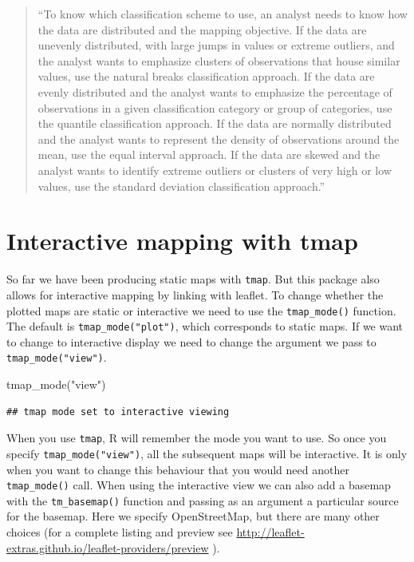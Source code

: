 \documentclass[
]{book}
\makeatletter
\newenvironment{Shaded}{\begin{snugshade}}{\end{snugshade}}
\newcommand{\FunctionTok}[1]{\textcolor[rgb]{0,0,0}{#1}}
\newcommand{\NormalTok}[1]{#1}
\newcommand{\StringTok}[1]{\textcolor[rgb]{0.5,0.5,0.5}{#1}}
\newenvironment{kframe}{%
\medskip{}
\setlength{\fboxsep}{.8em}
 \def\at@end@of@kframe{}%
 \ifinner\ifhmode%
  \def\at@end@of@kframe{\end{minipage}}%
  \begin{minipage}{\columnwidth}%
 \fi\fi%
 \def\FrameCommand##1{\hskip\@totalleftmargin \hskip-\fboxsep
 \colorbox{shadecolor}{##1}\hskip-\fboxsep
     \hskip-\linewidth \hskip-\@totalleftmargin \hskip\columnwidth}%
 \MakeFramed {\advance\hsize-\width
   \@totalleftmargin\z@ \linewidth\hsize
   \@setminipage}}%
 {\par\unskip\endMakeFramed%
 \at@end@of@kframe}
\renewenvironment{Shaded}{\begin{kframe}}{\end{kframe}}
\makeatother
\begin{document}
\begin{quote}
``To know which classification scheme to use, an analyst needs to know how the
data are distributed and the mapping objective. If the data are unevenly distributed, with large jumps in values or extreme outliers, and the analyst wants to emphasize clusters of observations that house similar values, use the natural breaks classification approach. If the data are evenly distributed and the analyst wants to emphasize the percentage of observations in a given classification category or group of categories, use the quantile classification approach. If the data are normally distributed and the analyst wants to represent the density of observations around the mean, use the equal interval approach. If the data are skewed and the analyst wants to identify extreme outliers or clusters of very high or low values, use the standard deviation classification
approach.''
\end{quote}

\hypertarget{interactive-mapping-with-tmap}{%
\section{Interactive mapping with tmap}\label{interactive-mapping-with-tmap}}

So far we have been producing static maps with \texttt{tmap}. But this package also allows for interactive mapping by linking with leaflet. To change whether the plotted maps are static or interactive we need to use the \texttt{tmap\_mode()} function. The default is \texttt{tmap\_mode("plot")}, which corresponds to static maps. If we want to change to interactive display we need to change the argument we pass to \texttt{tmap\_mode("view")}.

\begin{Shaded}
\begin{Highlighting}[]
\FunctionTok{tmap\_mode}\NormalTok{(}\StringTok{"view"}\NormalTok{)}
\end{Highlighting}
\end{Shaded}

\begin{verbatim}
## tmap mode set to interactive viewing
\end{verbatim}

When you use \texttt{tmap}, R will remember the mode you want to use. So once you specify \texttt{tmap\_mode("view")}, all the subsequent maps will be interactive. It is only when you want to change this behaviour that you would need another \texttt{tmap\_mode()} call. When using the interactive view we can also add a basemap with the \texttt{tm\_basemap()} function and passing as an argument a particular source for the basemap. Here we specify OpenStreetMap, but there are many other choices (for a complete listing and preview see \url{http://leaflet-extras.github.io/leaflet-providers/preview} ).
\end{document}
